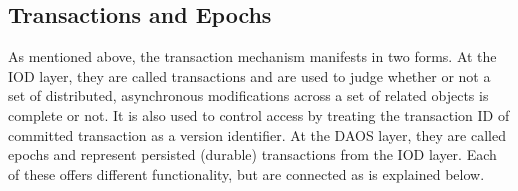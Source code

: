 \documentclass[conference]{IEEEtran}
\newcommand{\DDT}{D\textsuperscript{2}T~}
\newcommand{\DDTns}{D\textsuperscript{2}T}
\begin{document}
%
%

\subsection{Transactions and Epochs}
\label{sec:transactions}

As mentioned above, the transaction mechanism manifests in two forms. At the
IOD layer, they are called transactions and are used to judge whether or not a
set of distributed, asynchronous modifications across a set of related objects
is complete or not.  It is also used to control access by treating the
transaction ID of committed transaction as a version identifier.  At the DAOS
layer, they are called epochs and represent persisted (durable) transactions
from the IOD layer. Each of these offers different functionality, but are
connected as is explained below.
\end{document}
